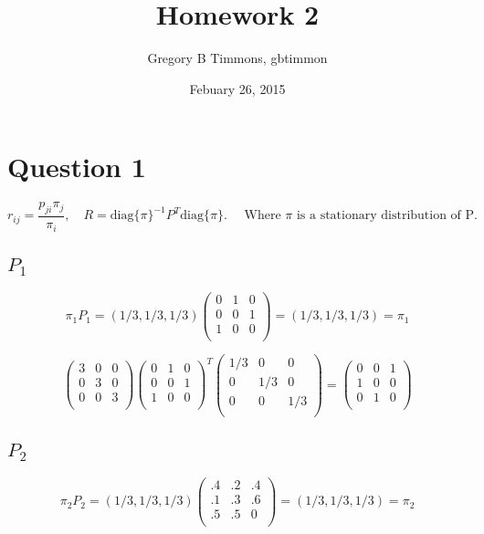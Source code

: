 \documentclass{article}
\begin{document}

\title{Homework 2}
\date{Febuary 26, 2015}
\author{Gregory B Timmons, gbtimmon}
\maketitle
\section*{Question 1}
\[ r_{ij} = \frac{p_{ji}\pi_j}{\pi_i}, \quad R = \mbox{diag}\{\pi\}^{-1} P^{T}
\mbox{diag}\{\pi\}.\quad \mbox{ Where }\pi \mbox{ is a stationary distribution
of P.}\]
\subsection*{\underline{$P_1$}}
\[ \pi_1 P_1 =  \left( 1/3, 1/3, 1/3 \right) \left( \begin{array}{ccc}
	0&1&0\\
	0&0&1\\
    1&0&0\\
\end{array}\right)  = \left( 1/3, 1/3, 1/3 \right) = \pi_1\]

\[
\left( \begin{array}{ccc}
	3&0&0\\
	0&3&0\\
    0&0&3\\
\end{array}\right)
\left( \begin{array}{ccc}
	0&1&0\\
	0&0&1\\
    1&0&0\\
\end{array}\right)^{T}
\left( \begin{array}{ccc}
	1/3	&0&0\\
	0&1/3&0\\
    0&0&1/3
    \\
\end{array}\right) = 
\left( \begin{array}{ccc}
	0&0&1\\
	1&0&0\\
    0&1&0\\
\end{array}\right)
\]

\subsection*{\underline{$P_2$}}
\[ \pi_2 P_2 =  \left( 1/3, 1/3, 1/3 \right) \left( \begin{array}{ccc}
	.4&.2&.4\\
	.1&.3&.6\\
    .5&.5& 0\\
\end{array}\right)  = \left( 1/3, 1/3, 1/3 \right) = \pi_2\]
\end{document}
